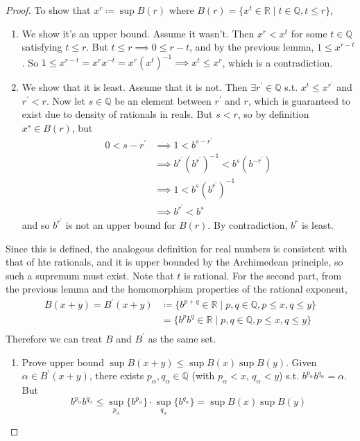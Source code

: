   \begin{proof}
    To show that $x^r \coloneqq \sup B(r)$ where $B(r) = \{x^t \in \mathbb{R} \mid t \in \mathbb{Q}, t \leq r \}$, 
    \begin{enumerate}
      \item We show it's an upper bound. Assume it wasn't. Then $x^r < x^t$ for some $t \in \mathbb{Q}$ satisfying $t \leq r$. But $t \leq r \implies 0 \leq r - t$, and by the previous lemma, $1 \leq x^{r - t}$. So $1 \leq x^{r-t} = x^{r} x^{-t} = x^r (x^t)^{-1} \implies x^t \leq x^r$, which is a contradiction. 
      \item We show that it is least. Assume that it is not. Then $\exists r^\prime \in \mathbb{Q}$ s.t. $x^t \leq x^{r^\prime}$ and $r^\prime < r$. Now let $s \in \mathbb{Q}$ be an element between $r^\prime$ and $r$, which is guaranteed to exist due to density of rationals in reals. But $s < r$, so by definition $x^s \in B(r)$, but 
      \begin{align}
        0 < s - r^\prime & \implies 1 < b^{s - r^\prime} \\
                         & \implies b^{r^\prime} (b^{r^\prime})^{-1} < b^s (b^{-r^\prime}) \\
                         & \implies 1 < b^s (b^{r^\prime})^{-1} \\
                         & \implies b^{r^\prime} < b^s
      \end{align}
      and so $b^{r^\prime}$ is not an upper bound for $B(r)$. By contradiction, $b^r$ is least. 
    \end{enumerate}
    Since this is defined, the analogous definition for real numbers is consistent with that of hte rationals, and it is upper bounded by the Archimedean principle, so such a supremum must exist. Note that $t$ is rational. For the second part, from the previous lemma and the homomorphism properties of the rational exponent, 
    \begin{align}
      B(x + y) = B^\prime (x + y) & \coloneqq \{b^{p+q} \in \mathbb{R} \mid p, q \in \mathbb{Q}, p \leq x, q \leq y\} \\
                                  & = \{b^p b^q \in \mathbb{R} \mid p, q \in \mathbb{Q}, p \leq x, q \leq y\} \\
    \end{align}
    Therefore we can treat $B$ and $B^\prime$ as the same set. 
    \begin{enumerate}
      \item Prove upper bound $\sup{B(x + y)} \leq \sup{B(x)} \sup{B(y)}$. Given $\alpha \in B^\prime (x + y)$, there exists $p_\alpha, q_{\alpha} \in \mathbb{Q}$ (with $p_\alpha < x$, $q_\alpha < y$) s.t. $b^{p_{\alpha}} b^{q_{\alpha}} = \alpha$. But 
      \begin{equation}
        b^{p_{\alpha}} b^{q_{\alpha}} \leq \sup_{p_{\alpha}} \{ b^{p_{\alpha}}\} \cdot \sup_{q_{\alpha}} \{b^{q_{\alpha}}\} = \sup{B(x)} \sup{B(y)}
      \end{equation}


\end{enumerate}
\end{proof}
